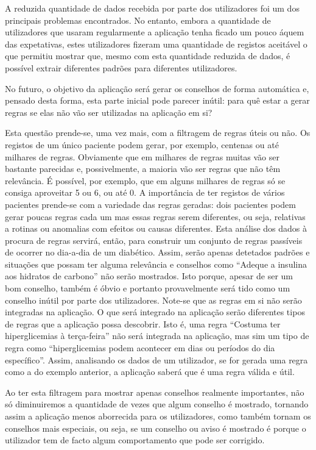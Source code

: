 A reduzida quantidade de dados recebida por parte dos utilizadores foi um dos principais problemas encontrados. No entanto, embora a quantidade de utilizadores que usaram regularmente a aplicação tenha ficado um pouco áquem das expetativas, estes utilizadores fizeram uma quantidade de registos aceitável o que permitiu mostrar que, mesmo com esta quantidade reduzida de dados, é possível extrair diferentes padrões para diferentes utilizadores.

No futuro, o objetivo da aplicação será gerar os conselhos de forma automática e, pensado desta forma, esta parte inicial pode parecer inútil: para quê estar a gerar regras se elas não vão ser utilizadas na aplicação em si? 

Esta questão prende-se, uma vez mais, com a filtragem de regras úteis ou não. Os registos de um único paciente podem gerar, por exemplo, centenas ou até milhares de regras. Obviamente que em milhares de regras muitas vão ser bastante parecidas e, possivelmente, a maioria vão ser regras que não têm relevância. É possível, por exemplo, que em alguns milhares de regras só se consiga aproveitar 5 ou 6, ou até 0. A importância de ter registos de vários pacientes prende-se com a variedade das regras geradas: dois pacientes podem gerar poucas regras cada um mas essas regras serem diferentes, ou seja, relativas a rotinas ou anomalias com efeitos ou causas diferentes. Esta análise dos dados à procura de regras servirá, então, para construir um conjunto de regras passíveis de ocorrer no dia-a-dia de um diabético. Assim, serão apenas detetados padrões e situações que possam ter alguma relevância e conselhos como ``Adeque a insulina aos hidratos de carbono'' não serão mostrados. Isto porque, apesar de ser um bom conselho, também é óbvio e portanto provavelmente será tido como um conselho inútil por parte dos utilizadores. Note-se que as regras em si não serão integradas na aplicação. O que será integrado na aplicação serão diferentes tipos de regras que a aplicação possa descobrir. Isto é, uma regra ``Costuma ter hiperglicemias à terça-feira'' não será integrada na aplicação, mas sim um tipo de regra como ``hiperglicemias podem acontecer em dias ou períodos do dia específico''. Assim, analisando os dados de um utilizador, se for gerada uma regra como a do exemplo anterior, a aplicação saberá que é uma regra válida e útil. 

Ao ter esta filtragem para mostrar apenas conselhos realmente importantes, não só diminuiremos a quantidade de vezes que algum conselho é mostrado, tornando assim a aplicação menos aborrecida para os utilizadores, como também tornam os conselhos mais especiais, ou seja, se um conselho ou aviso é mostrado é porque o utilizador tem de facto algum comportamento que pode ser corrigido.

